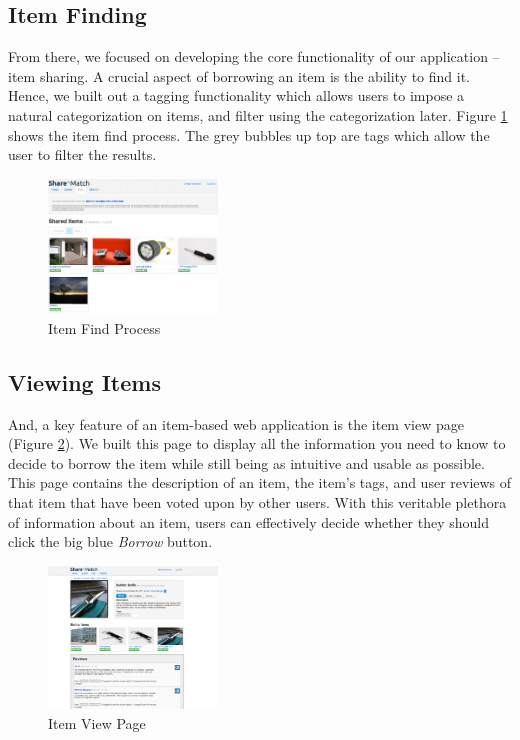 \documentclass{acm_proc_article-sp}
\begin{document}
\subsection{Item Finding}
From there, we focused on developing the core functionality of our application -- item sharing. A crucial aspect of borrowing
an item is the ability to find it. Hence, we built out a tagging functionality which allows users to impose a natural
categorization on items, and filter using the categorization later. Figure \ref{fig:ItemSearch.png} shows the item find
process. The grey bubbles up top are tags which allow the user to filter the results.
\begin{figure}[h]
\begin{centering}
\includegraphics[width=0.4\textwidth]{ItemSearch.png}
\caption{Item Find Process}
\label{fig:ItemSearch.png}
\end{centering}
\end{figure}

\subsection{Viewing Items}
And, a key feature of an item-based web application is the item view page (Figure \ref{fig:ItemView.png}). 
We built this page to display all the information
you need to know to decide to borrow the item while still being as intuitive and usable as possible. This page contains
the description of an item, the item's tags, and user reviews of that item that have been voted upon by other users.
With this veritable plethora of information about an item, users can effectively decide whether they should click the
big blue \textit{Borrow} button.

\begin{figure}[h]
\begin{centering}
\includegraphics[width=0.4\textwidth]{ItemView.png}
\caption{Item View Page}
\label{fig:ItemView.png}
\end{centering}
\end{figure}
\end{document}
